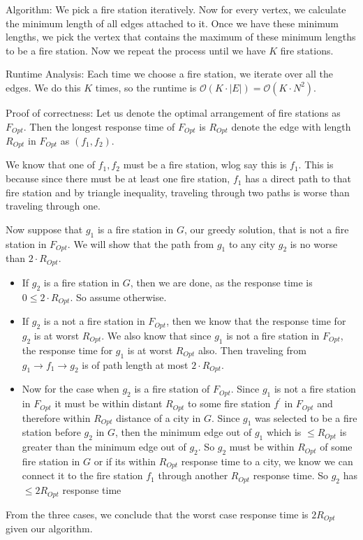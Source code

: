 \documentclass{article}
\begin{document}
\begin{answer}
    Algorithm: We pick a fire station iteratively. Now for every vertex, we calculate the minimum length of all edges attached to it. Once we have these minimum lengths, we pick the vertex that contains the maximum of these minimum lengths to be a fire station. Now we repeat the process until we have $K$ fire stations.

    Runtime Analysis: Each time we choose a fire station, we iterate over all the edges. We do this $K$ times, so the runtime is $\mathcal{O}(K \cdot \lvert E \rvert) = \mathcal{O}(K \cdot N^{2})$.

    Proof of correctness: Let us denote the optimal arrangement of fire stations as $F_{Opt}$. Then the longest response time of $F_{Opt}$ is $R_{Opt}$ denote the edge with length $R_{Opt}$ in $F_{Opt}$ as $(f_{1}, f_{2})$. 

    We know that one of $f_{1}, f_{2}$ must be a fire station, wlog say this is $f_{1}$. This is because since there must be at least one fire station, $f_{1}$ has a direct path to that fire station and by triangle inequality, traveling through two paths is worse than traveling through one.

    Now suppose that $g_{1}$ is a fire station in $G$, our greedy solution, that is not a fire station in $F_{Opt}$. We will show that the path from $g_{1}$ to any city $g_{2}$ is no worse than $2 \cdot R_{Opt}$. 
    \begin{itemize}
        \item If $g_{2}$ is a fire station in $G$, then we are done, as the response time is $0 \leq 2 \cdot R_{Opt}$. So assume otherwise.

        \item If $g_{2}$ is a not a fire station in $F_{Opt}$, then we know that the response time for $g_{2}$ is at worst $R_{Opt}$. We also know that since $g_{1}$ is not a fire station in $F_{Opt}$, the response time for $g_{1}$ is at worst $R_{Opt}$ also. Then traveling from $g_{1} \rightarrow f_{1} \rightarrow g_{2}$ is of path length at most $2 \cdot R_{Opt}$.

        \item Now for the case when $g_{2}$ is a fire station of $F_{Opt}$. Since $g_{1}$ is not a fire station in $F_{Opt}$ it must be within distant $R_{Opt}$ to some fire station $f^{\prime}$ in $F_{Opt}$ and therefore within $R_{Opt}$ distance of a city in $G$. Since $g_{1}$ was selected to be a fire station before $g_{2}$ in $G$, then the minimum edge out of $g_{1}$ which is $\leq R_{Opt}$ is greater than the minimum edge out of $g_{2}$. So $g_{2}$ must be within $R_{Opt}$ of some fire station in $G$ or if its within $R_{Opt}$ response time to a city, we know we can connect it to the fire station $f_{1}$ through another $R_{Opt}$ response time. So $g_{2}$ has $\leq 2R_{Opt}$ response time
    \end{itemize}
    From the three cases, we conclude that the worst case response time is $2 R_{Opt}$ given our algorithm.
\end{answer}
\end{document}
